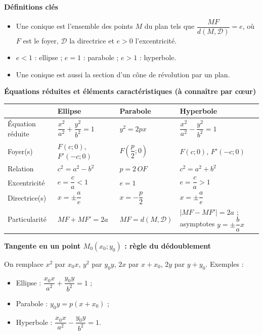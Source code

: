 \documentclass[11pt]{article}
\newcommand{\cle}[1]{{\popxbold\color{popdark}#1}}
\begin{document}
\begin{bilan}
\textbf{Définitions clés}
\begin{itemize}
  \item Une \cle{conique} est l'ensemble des points $M$ du plan tels que $\dfrac{MF}{d(M,\mathcal{D})}=e$, où $F$ est le \cle{foyer}, $\mathcal{D}$ la \cle{directrice} et $e>0$ l'\cle{excentricité}.
  \item $e<1$ : \cle{ellipse} ; $e=1$ : \cle{parabole} ; $e>1$ : \cle{hyperbole}.
  \item Une conique est aussi la section d'un cône de révolution par un plan.
\end{itemize}

\textbf{Équations réduites et éléments caractéristiques (à connaître par c\oe ur)}
\begin{center}
\begin{tabularx}{\linewidth}{|l|X|X|X|}
\hline
\rowcolor{popblueL} & \textbf{Ellipse} & \textbf{Parabole} & \textbf{Hyperbole} \\
\hline
Équation réduite & $\dfrac{x^2}{a^2}+\dfrac{y^2}{b^2}=1$ & $y^2=2px$ & $\dfrac{x^2}{a^2}-\dfrac{y^2}{b^2}=1$ \\
\hline
Foyer(s) & $F(c;0)$, $F'(-c;0)$ & $F\left(\dfrac{p}{2};0\right)$ & $F(c;0)$, $F'(-c;0)$ \\
\hline
Relation & $c^2=a^2-b^2$ & $p=2\,OF$ & $c^2=a^2+b^2$ \\
\hline
Excentricité & $e=\dfrac{c}{a}<1$ & $e=1$ & $e=\dfrac{c}{a}>1$ \\
\hline
Directrice(s) & $x=\pm\dfrac{a}{e}$ & $x=-\dfrac{p}{2}$ & $x=\pm\dfrac{a}{e}$ \\
\hline
Particularité & $MF+MF'=2a$ & $MF=d(M,\mathcal{D})$ & $|MF-MF'|=2a$ ; asymptotes $y=\pm\dfrac{b}{a}x$ \\
\hline
\end{tabularx}
\end{center}

\textbf{Tangente en un point $M_0(x_0;y_0)$ : règle du dédoublement}

On remplace $x^2$ par $x_0x$, $y^2$ par $y_0y$, $2x$ par $x+x_0$, $2y$ par $y+y_0$. Exemples :
\begin{itemize}
  \item Ellipse : $\dfrac{x_0x}{a^2}+\dfrac{y_0y}{b^2}=1$ ;
  \item Parabole : $y_0y=p(x+x_0)$ ;
  \item Hyperbole : $\dfrac{x_0x}{a^2}-\dfrac{y_0y}{b^2}=1$.
\end{itemize}


\end{bilan}
\end{document}
